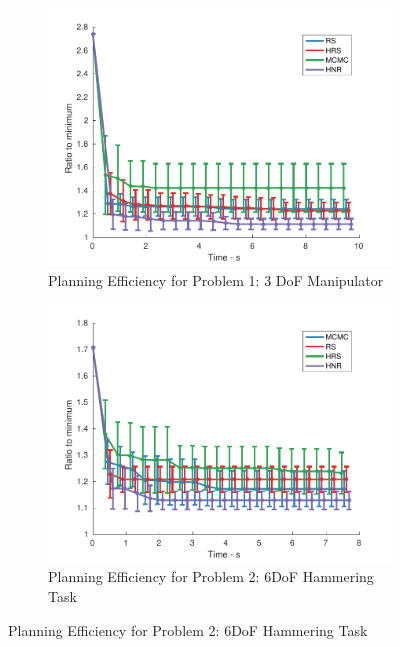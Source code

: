 \documentclass[letterpaper, 10 pt, conference]{ieeeconf}  %
\begin{document}
\begin{figure}[t!]
	\centering
	\begin{subfigure}[b]{0.5\textwidth}
		\includegraphics[width=\linewidth]{fig/planning_efficiency/3dof_general}
		\caption{\captionstyle Planning Efficiency for Problem 1: 3 DoF Manipulator}
		\label{fig:planning_efficiency:3dof:general}
	\end{subfigure}	
	\begin{subfigure}[b]{0.5\textwidth}
		\includegraphics[width=\linewidth]{fig/planning_efficiency/6dof_hammering}
		\caption{\captionstyle Planning Efficiency for Problem 2: 6DoF Hammering Task}
		\label{fig:planning_efficiency:6dof:hammering}
	\end{subfigure}

\end{figure}
\end{document}
